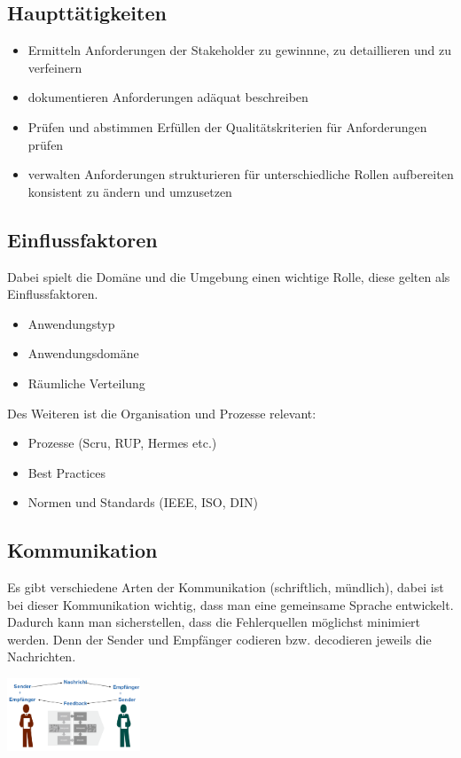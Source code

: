 \documentclass{report}
\newenvironment{Figure}
	{\par\medskip\noindent\minipage{\linewidth}}
	{\endminipage\par\medskip}
\theoremstyle{definition}
\theoremstyle{example}
\begin{document}
\subsection{Haupttätigkeiten}
\begin{itemize}
   \item Ermitteln
   \subitem Anforderungen der Stakeholder zu gewinnne, zu detaillieren und zu verfeinern 
   \item dokumentieren
   \subitem Anforderungen adäquat beschreiben
   \item Prüfen und abstimmen
   \subitem Erfüllen der Qualitätskriterien für Anforderungen prüfen
   \item verwalten
   \subitem Anforderungen strukturieren
   \subitem für unterschiedliche Rollen aufbereiten
   \subitem konsistent zu ändern und umzusetzen
\end{itemize}

\subsection{Einflussfaktoren}
Dabei spielt die Domäne und die Umgebung einen wichtige Rolle, diese gelten als Einflussfaktoren.
\begin{itemize}
   \item Anwendungstyp
   \item Anwendungsdomäne
   \item Räumliche Verteilung
\end{itemize}
Des Weiteren ist die Organisation und Prozesse relevant:
\begin{itemize}
   \item Prozesse (Scru, RUP, Hermes etc.)
   \item Best Practices
   \item Normen und Standards (IEEE, ISO, DIN)
\end{itemize}

\subsection{Kommunikation}
Es gibt verschiedene Arten der Kommunikation (schriftlich, mündlich), dabei ist bei dieser Kommunikation wichtig, dass man eine gemeinsame Sprache entwickelt.\\
Dadurch kann man sicherstellen, dass die Fehlerquellen möglichst minimiert werden. Denn der Sender und Empfänger codieren bzw. decodieren jeweils die Nachrichten.

\begin{Figure}
   \centering
    \includegraphics[width=150px]{img/SenderEmpfaenger.png}
        \label{fig:Modell des Sender und Empfaengers}
\end{Figure}
\end{document}
